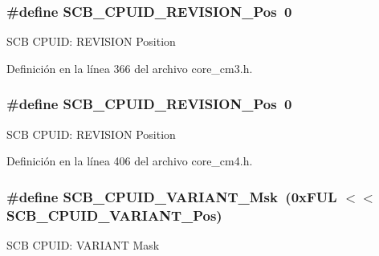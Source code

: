 \subsubsection[{\texorpdfstring{S\+C\+B\+\_\+\+C\+P\+U\+I\+D\+\_\+\+R\+E\+V\+I\+S\+I\+O\+N\+\_\+\+Pos}{SCB_CPUID_REVISION_Pos}}]{\setlength{\rightskip}{0pt plus 5cm}\#define S\+C\+B\+\_\+\+C\+P\+U\+I\+D\+\_\+\+R\+E\+V\+I\+S\+I\+O\+N\+\_\+\+Pos~0}\hypertarget{group___c_m_s_i_s___s_c_b_ga3c3d9071e574de11fb27ba57034838b1}{}\label{group___c_m_s_i_s___s_c_b_ga3c3d9071e574de11fb27ba57034838b1}
S\+CB C\+P\+U\+ID\+: R\+E\+V\+I\+S\+I\+ON Position 

Definición en la línea 366 del archivo core\+\_\+cm3.\+h.

\subsubsection[{\texorpdfstring{S\+C\+B\+\_\+\+C\+P\+U\+I\+D\+\_\+\+R\+E\+V\+I\+S\+I\+O\+N\+\_\+\+Pos}{SCB_CPUID_REVISION_Pos}}]{\setlength{\rightskip}{0pt plus 5cm}\#define S\+C\+B\+\_\+\+C\+P\+U\+I\+D\+\_\+\+R\+E\+V\+I\+S\+I\+O\+N\+\_\+\+Pos~0}\hypertarget{group___c_m_s_i_s___s_c_b_ga3c3d9071e574de11fb27ba57034838b1}{}\label{group___c_m_s_i_s___s_c_b_ga3c3d9071e574de11fb27ba57034838b1}
S\+CB C\+P\+U\+ID\+: R\+E\+V\+I\+S\+I\+ON Position 

Definición en la línea 406 del archivo core\+\_\+cm4.\+h.

\subsubsection[{\texorpdfstring{S\+C\+B\+\_\+\+C\+P\+U\+I\+D\+\_\+\+V\+A\+R\+I\+A\+N\+T\+\_\+\+Msk}{SCB_CPUID_VARIANT_Msk}}]{\setlength{\rightskip}{0pt plus 5cm}\#define S\+C\+B\+\_\+\+C\+P\+U\+I\+D\+\_\+\+V\+A\+R\+I\+A\+N\+T\+\_\+\+Msk~(0x\+F\+U\+L $<$$<$ S\+C\+B\+\_\+\+C\+P\+U\+I\+D\+\_\+\+V\+A\+R\+I\+A\+N\+T\+\_\+\+Pos)}\hypertarget{group___c_m_s_i_s___s_c_b_gad358dfbd04300afc1824329d128b99e8}{}\label{group___c_m_s_i_s___s_c_b_gad358dfbd04300afc1824329d128b99e8}
S\+CB C\+P\+U\+ID\+: V\+A\+R\+I\+A\+NT Mask 

